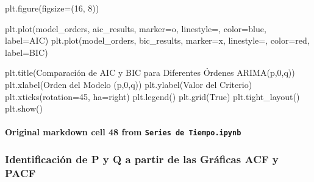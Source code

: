 \documentclass[
  11pt,
]{article}
\newenvironment{Shaded}{}{}
\newcommand{\DecValTok}[1]{\textcolor[rgb]{0.25,0.63,0.44}{#1}}
\newcommand{\NormalTok}[1]{#1}
\newcommand{\OperatorTok}[1]{\textcolor[rgb]{0.40,0.40,0.40}{#1}}
\newcommand{\StringTok}[1]{\textcolor[rgb]{0.25,0.44,0.63}{#1}}
\newcommand{\VariableTok}[1]{\textcolor[rgb]{0.10,0.09,0.49}{#1}}
\begin{document}
\begin{Shaded}
\begin{Highlighting}[]
\NormalTok{plt.figure(figsize}\OperatorTok{=}\NormalTok{(}\DecValTok{16}\NormalTok{, }\DecValTok{8}\NormalTok{))}

\NormalTok{plt.plot(model\_orders, aic\_results, marker}\OperatorTok{=}\StringTok{\textquotesingle{}o\textquotesingle{}}\NormalTok{, linestyle}\OperatorTok{=}\StringTok{\textquotesingle{}{-}\textquotesingle{}}\NormalTok{, color}\OperatorTok{=}\StringTok{\textquotesingle{}blue\textquotesingle{}}\NormalTok{, label}\OperatorTok{=}\StringTok{\textquotesingle{}AIC\textquotesingle{}}\NormalTok{)}
\NormalTok{plt.plot(model\_orders, bic\_results, marker}\OperatorTok{=}\StringTok{\textquotesingle{}x\textquotesingle{}}\NormalTok{, linestyle}\OperatorTok{=}\StringTok{\textquotesingle{}{-}{-}\textquotesingle{}}\NormalTok{, color}\OperatorTok{=}\StringTok{\textquotesingle{}red\textquotesingle{}}\NormalTok{, label}\OperatorTok{=}\StringTok{\textquotesingle{}BIC\textquotesingle{}}\NormalTok{)}

\NormalTok{plt.title(}\StringTok{\textquotesingle{}Comparación de AIC y BIC para Diferentes Órdenes ARIMA(p,0,q)\textquotesingle{}}\NormalTok{)}
\NormalTok{plt.xlabel(}\StringTok{\textquotesingle{}Orden del Modelo (p,0,q)\textquotesingle{}}\NormalTok{)}
\NormalTok{plt.ylabel(}\StringTok{\textquotesingle{}Valor del Criterio\textquotesingle{}}\NormalTok{)}
\NormalTok{plt.xticks(rotation}\OperatorTok{=}\DecValTok{45}\NormalTok{, ha}\OperatorTok{=}\StringTok{\textquotesingle{}right\textquotesingle{}}\NormalTok{)}
\NormalTok{plt.legend()}
\NormalTok{plt.grid(}\VariableTok{True}\NormalTok{)}
\NormalTok{plt.tight\_layout()}
\NormalTok{plt.show()}
\end{Highlighting}
\end{Shaded}

\paragraph{\texorpdfstring{Original markdown cell 48 from \texttt{Series\ de\ Tiempo.ipynb}}{Original markdown cell 48 from Series de Tiempo.ipynb}}\label{original-markdown-cell-48-from-series-de-tiempoipynb}

\subsubsection{Identificación de P y Q a partir de las Gráficas ACF y PACF}\label{identificaciuxf3n-de-p-y-q-a-partir-de-las-gruxe1ficas-acf-y-pacf}
\end{document}
